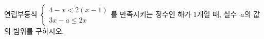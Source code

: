 연립부등식 $\begin{cases} 4-x<2(x-1) \\ 3x-a\le 2x \end{cases}$를 만족시키는 정수인 해가 $1$개일 때, 실수~$a$의 값의 범위를 구하시오.
